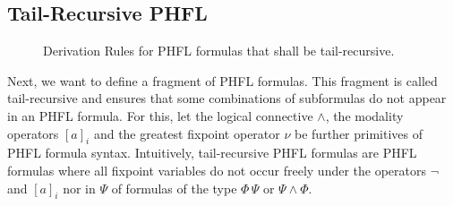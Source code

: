 \subsection{Tail-Recursive PHFL}\label{subsec:tail-recursivePhfl}


\begin{figure}
    \caption{Derivation Rules for PHFL formulas that shall be tail-recursive.}
    \label{figure:phfl-tail-recursive}
\end{figure}

Next, we want to define a fragment of PHFL formulas. This fragment is called tail-recursive and ensures that
some combinations of subformulas do not appear in an PHFL formula. For this, let the logical connective
$\wedge$, the modality operators $[a]_i$ and the greatest fixpoint operator $\nu$ be further primitives of PHFL formula
syntax. Intuitively, tail-recursive PHFL formulas are PHFL formulas where all fixpoint variables do not occur freely
under the operators $\neg$ and $[a]_i$ nor in $\Psi$ of formulas of the type $\Phi\,\Psi$ or $\Psi \wedge \Phi$.

